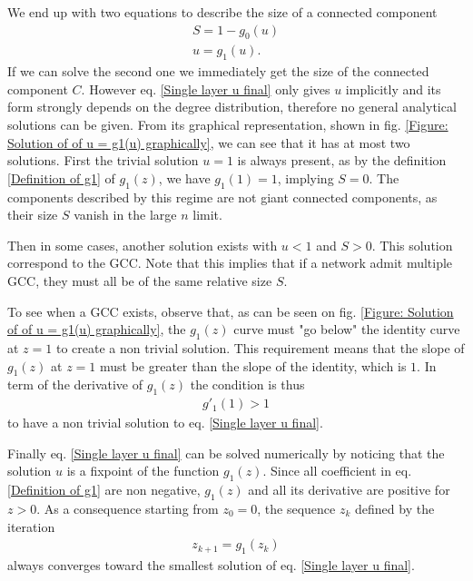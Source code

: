 \documentclass[
11pt, %
english, %
singlespacing, %
nolistspacing, %
liststotoc, %
headsepline, %
]{MastersDoctoralThesis} %
\begin{document}
We end up with two equations to describe the size of a connected component
\begin{align}
	S = 1 - g_0(u) \label{Single layer S final} \\
	u = g_1(u). \label{Single layer u final}
\end{align}
If we can solve the second one we immediately get the size of the connected component $C$. However eq. \eqref{Single layer u final} only gives $u$ implicitly and its form strongly depends on the degree distribution, therefore no general analytical solutions can be given. From its graphical representation, shown in fig. \ref{Figure: Solution of of u = g1(u) graphically}, we can see that it has at most two solutions. First the trivial solution $u = 1$ is always present, as by the definition \eqref{Definition of g1} of $g_1(z)$, we have $g_1(1) = 1$, implying $S = 0$. The components described by this regime are not giant connected components, as their size $S$ vanish in the large $n$ limit.

Then in some cases, another solution exists with $u < 1$ and $S > 0$. This solution correspond to the GCC. Note that this implies that if a network admit multiple GCC, they must all be of the same relative size $S$.


To see when a GCC exists, observe that, as can be seen on fig. \ref{Figure: Solution of of u = g1(u) graphically}, the $g_1(z)$ curve must "go below" the identity curve at $z = 1$ to create a non trivial solution. This requirement means that the slope of $g_1(z)$ at $z = 1$ must be greater than the slope of the identity, which is $1$. In term of the derivative of $g_1(z)$ the condition is thus
\begin{align}
	g'_1(1) > 1 \label{Boundary condition for single layer}
\end{align}
to have a non trivial solution to eq. \eqref{Single layer u final}.

Finally eq. \eqref{Single layer u final} can be solved numerically by noticing that the solution $u$ is a fixpoint of the function $g_1(z)$. Since all coefficient in eq. \eqref{Definition of g1} are non negative, $g_1(z)$ and all its derivative are positive for $z > 0$. As a consequence starting from $z_0 = 0$, the sequence $z_k$ defined by the iteration
\begin{align}
	z_{k + 1}  = g_1(z_k)  \label{Single layer fixpoint g1 iteration}
\end{align}
always converges toward the smallest solution of eq. \eqref{Single layer u final}.
\end{document}
